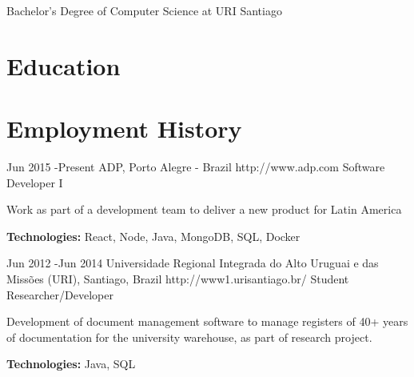 \documentclass[10pt]{article} %
\begin{document}
Bachelor's Degree of Computer Science at URI Santiago


\section{Education}





\section{Employment History}

\job
{Jun 2015 -}{Present}
{ADP, Porto Alegre - Brazil}
{http://www.adp.com}
{Software Developer I}
{Work as part of a development team to deliver a new product for Latin America \\
\rule{0mm}{5mm}\textbf{Technologies:} React, Node, Java, MongoDB, SQL, Docker}


\job
{Jun 2012 -}{Jun 2014}
{Universidade Regional Integrada do Alto Uruguai e das Missões (URI), Santiago, Brazil}
{http://www1.urisantiago.br/}
{Student Researcher/Developer}
{Development of document management software to manage registers of 40+ years of documentation for the university warehouse, as part of research project.
\rule{0mm}{5mm}\textbf{Technologies:} Java, SQL}

\end{document}
